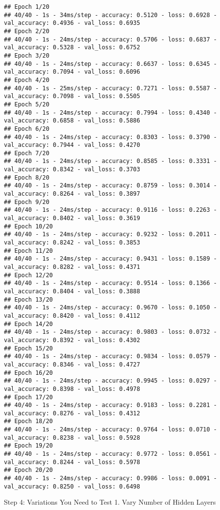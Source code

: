 \documentclass[
]{article}
\begin{document}
\begin{verbatim}
## Epoch 1/20
## 40/40 - 1s - 34ms/step - accuracy: 0.5120 - loss: 0.6928 - val_accuracy: 0.4936 - val_loss: 0.6935
## Epoch 2/20
## 40/40 - 1s - 24ms/step - accuracy: 0.5706 - loss: 0.6837 - val_accuracy: 0.5328 - val_loss: 0.6752
## Epoch 3/20
## 40/40 - 1s - 24ms/step - accuracy: 0.6637 - loss: 0.6345 - val_accuracy: 0.7094 - val_loss: 0.6096
## Epoch 4/20
## 40/40 - 1s - 25ms/step - accuracy: 0.7271 - loss: 0.5587 - val_accuracy: 0.7098 - val_loss: 0.5505
## Epoch 5/20
## 40/40 - 1s - 24ms/step - accuracy: 0.7994 - loss: 0.4340 - val_accuracy: 0.6858 - val_loss: 0.5886
## Epoch 6/20
## 40/40 - 1s - 24ms/step - accuracy: 0.8303 - loss: 0.3790 - val_accuracy: 0.7944 - val_loss: 0.4270
## Epoch 7/20
## 40/40 - 1s - 24ms/step - accuracy: 0.8585 - loss: 0.3331 - val_accuracy: 0.8342 - val_loss: 0.3703
## Epoch 8/20
## 40/40 - 1s - 24ms/step - accuracy: 0.8759 - loss: 0.3014 - val_accuracy: 0.8264 - val_loss: 0.3897
## Epoch 9/20
## 40/40 - 1s - 24ms/step - accuracy: 0.9116 - loss: 0.2263 - val_accuracy: 0.8402 - val_loss: 0.3619
## Epoch 10/20
## 40/40 - 1s - 24ms/step - accuracy: 0.9232 - loss: 0.2011 - val_accuracy: 0.8242 - val_loss: 0.3853
## Epoch 11/20
## 40/40 - 1s - 24ms/step - accuracy: 0.9431 - loss: 0.1589 - val_accuracy: 0.8282 - val_loss: 0.4371
## Epoch 12/20
## 40/40 - 1s - 24ms/step - accuracy: 0.9514 - loss: 0.1366 - val_accuracy: 0.8404 - val_loss: 0.3888
## Epoch 13/20
## 40/40 - 1s - 24ms/step - accuracy: 0.9670 - loss: 0.1050 - val_accuracy: 0.8420 - val_loss: 0.4112
## Epoch 14/20
## 40/40 - 1s - 24ms/step - accuracy: 0.9803 - loss: 0.0732 - val_accuracy: 0.8392 - val_loss: 0.4302
## Epoch 15/20
## 40/40 - 1s - 24ms/step - accuracy: 0.9834 - loss: 0.0579 - val_accuracy: 0.8346 - val_loss: 0.4727
## Epoch 16/20
## 40/40 - 1s - 24ms/step - accuracy: 0.9945 - loss: 0.0297 - val_accuracy: 0.8398 - val_loss: 0.4978
## Epoch 17/20
## 40/40 - 1s - 24ms/step - accuracy: 0.9183 - loss: 0.2281 - val_accuracy: 0.8276 - val_loss: 0.4312
## Epoch 18/20
## 40/40 - 1s - 24ms/step - accuracy: 0.9764 - loss: 0.0710 - val_accuracy: 0.8238 - val_loss: 0.5928
## Epoch 19/20
## 40/40 - 1s - 24ms/step - accuracy: 0.9772 - loss: 0.0561 - val_accuracy: 0.8244 - val_loss: 0.5978
## Epoch 20/20
## 40/40 - 1s - 24ms/step - accuracy: 0.9986 - loss: 0.0091 - val_accuracy: 0.8250 - val_loss: 0.6498
\end{verbatim}

Step 4: Variations You Need to Test 1. Vary Number of Hidden Layers
\end{document}
